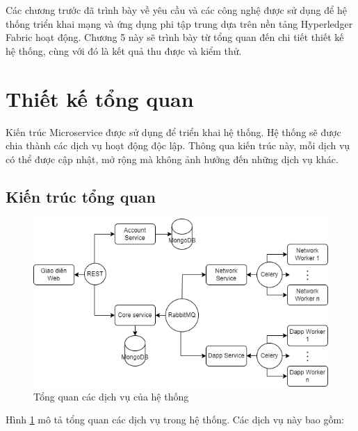 \documentclass[../DoAn.tex]{subfiles}
\begin{document}
Các chương trước đã trình bày về yêu cầu và các công nghệ được sử dụng để hệ
thống triển khai mạng và ứng dụng phi tập trung dựa trên nền tảng Hyperledger
Fabric hoạt động. Chương 5 này sẽ trình bày từ tổng quan đến chi tiết thiết kế
hệ thống, cùng với đó là kết quả thu được và kiểm thử.

\section{Thiết kế tổng quan}

Kiến trúc Microservice được sử dụng để triển khai hệ thống. Hệ thống sẽ được
chia thành các dịch vụ hoạt động độc lập. Thông qua kiến trúc này, mỗi dịch vụ
có thể được cập nhật, mở rộng mà không ảnh hưởng đến những dịch vụ khác.

\subsection{Kiến trúc tổng quan}

\begin{figure}[H]
    \centering
    \includegraphics[width=0.75\linewidth]{Hinhve/DoAn-KienTrucTongQuan.drawio.png}
    \caption{Tổng quan các dịch vụ của hệ thống}
    \label{fig:overal_architecture}
\end{figure}

Hình \ref{fig:overal_architecture} mô tả tổng quan các dịch vụ trong hệ thống.
Các dịch vụ này bao gồm:
\end{document}
